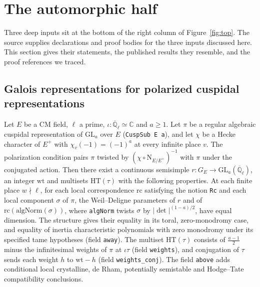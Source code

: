 \section{The automorphic half}\label{sec:automorphic}

Three deep inputs sit at the bottom of the right column of Figure~\ref{fig:top}. The source
supplies declarations and proof bodies for the three inputs discussed here. This section gives
their statements, the published results they resemble, and the proof references we traced.

\subsection{Galois representations for polarized cuspidal representations}\label{sec:galois}


\begin{statement}\label{st:row}
Let $E$ be a CM field, $\ell$ a prime, $\iota:\overline{\mathbb Q}_\ell\simeq\mathbb C$ and $a\ge1$. Let
$\pi$ be a regular algebraic cuspidal representation of $\mathrm{GL}_a$ over $E$
(\texttt{CuspSub E a}), and let $\chi$ be a Hecke character of $E^+$ with $\chi_v(-1)=(-1)^a$ at every
infinite place $v$. The polarization condition pairs $\pi$ twisted by
$(\chi\circ\mathrm N_{E/E^+})^{-1}$ with $\pi$ under the conjugated action. Then there exist a
continuous semisimple $r:G_E\to\mathrm{GL}_a(\overline{\mathbb Q}_\ell)$, an integer $\mathrm{wt}$
and multisets $\mathrm{HT}(\tau)$ with the following properties. At each finite place $w\nmid\ell$,
for each local correspondence $\mathrm{rc}$ satisfying the notion \texttt{Rc} and each local
component $\sigma$ of $\pi$, the Weil--Deligne parameters of $r$ and of
$\mathrm{rc}(\mathrm{algNorm}(\sigma))$, where \texttt{algNorm} twists $\sigma$ by
$|\det|^{(1-a)/2}$, have equal dimension. The structure  gives
their equality in its toral, zero-monodromy case, and equality of inertia characteristic polynomials
with zero monodromy under its specified tame hypotheses (field \texttt{away}). The multiset
$\mathrm{HT}(\tau)$ consists of $\frac{a-1}2$ minus the infinitesimal weights of $\pi$ at $\iota\tau$
(field \texttt{weights}), and conjugation of $\tau$ sends each weight $h$ to $\mathrm{wt}-h$ (field
\texttt{weights\_conj}). The field \texttt{above} adds conditional local crystalline, de Rham,
potentially semistable and Hodge--Tate compatibility conclusions.
\end{statement}

